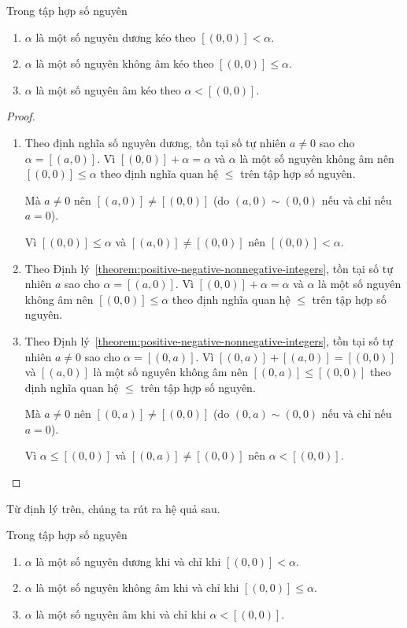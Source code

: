 \begin{theorem}
	Trong tập hợp số nguyên
	\begin{enumerate}[label={(\roman*)}]
		\item $\alpha$ là một số nguyên dương kéo theo $[(0,0)] < \alpha$.
		\item $\alpha$ là một số nguyên không âm kéo theo $[(0,0)] \leq \alpha$.
		\item $\alpha$ là một số nguyên âm kéo theo $\alpha < [(0,0)]$.
	\end{enumerate}
\end{theorem}

\begin{proof}
	\begin{enumerate}[label={(\roman*)}]
		\item Theo định nghĩa số nguyên dương, tồn tại số tự nhiên $a\ne 0$ sao cho $\alpha = [(a, 0)]$. Vì $[(0,0)] + \alpha = \alpha$ và $\alpha$ là một số nguyên không âm nên $[(0,0)]\leq \alpha$ theo định nghĩa quan hệ $\leq$ trên tập hợp số nguyên.

		      Mà $a\ne 0$ nên $[(a, 0)]\ne [(0, 0)]$ (do $(a, 0)\sim (0, 0)$ nếu và chỉ nếu $a = 0$).

		      Vì $[(0,0)]\leq\alpha$ và $[(a, 0)]\ne [(0,0)]$ nên $[(0,0)] < \alpha$.
		\item Theo Định lý~\ref{theorem:positive-negative-nonnegative-integers}, tồn tại số tự nhiên $a$ sao cho $\alpha = [(a, 0)]$. Vì $[(0,0)] + \alpha = \alpha$ và $\alpha$ là một số nguyên không âm nên $[(0,0)]\leq \alpha$ theo định nghĩa quan hệ $\leq$ trên tập hợp số nguyên.
		\item Theo Định lý~\ref{theorem:positive-negative-nonnegative-integers}, tồn tại số tự nhiên $a\ne 0$ sao cho $\alpha = [(0, a)]$. Vì $[(0,a)] + [(a,0)] = [(0,0)]$ và $[(a, 0)]$ là một số nguyên không âm nên $[(0,a)]\leq [(0,0)]$ theo định nghĩa quan hệ $\leq$ trên tập hợp số nguyên.

		      Mà $a\ne 0$ nên $[(0, a)]\ne [(0, 0)]$ (do $(0, a)\sim (0, 0)$ nếu và chỉ nếu $a = 0$).

		      Vì $\alpha\leq[(0,0)]$ và $[(0, a)]\ne [(0,0)]$ nên $\alpha < [(0,0)]$.
	\end{enumerate}
\end{proof}

Từ định lý trên, chúng ta rút ra hệ quả sau.
\begin{corollary}\label{corollary:positive-nonnegative-negative-precise-condition}
	Trong tập hợp số nguyên
	\begin{enumerate}[label={(\roman*)}]
		\item $\alpha$ là một số nguyên dương khi và chỉ khi $[(0,0)] < \alpha$.
		\item $\alpha$ là một số nguyên không âm khi và chỉ khi $[(0,0)] \leq \alpha$.
		\item $\alpha$ là một số nguyên âm khi và chỉ khi $\alpha < [(0,0)]$.
	\end{enumerate}
\end{corollary}

